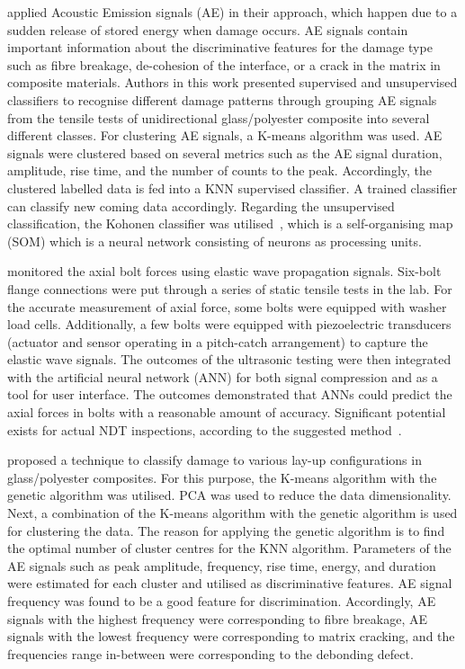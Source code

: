 \textcite{Godin2004} applied Acoustic Emission signals (AE) in their approach, which happen due to a sudden release of stored energy when damage occurs.
AE signals contain important information about the discriminative features 
for the damage type such as fibre breakage, de-cohesion of the interface, or a crack in the matrix in composite materials.
Authors in this work presented supervised and unsupervised classifiers to recognise different damage patterns through grouping AE signals from the tensile tests of unidirectional glass/polyester composite into several different classes. 
For clustering AE signals, a K-means algorithm was used. 
AE signals were clustered based on several metrics such as the AE signal duration, amplitude, rise time, and the number of counts to the peak.
Accordingly, the clustered labelled data is fed into a KNN supervised classifier.
A trained classifier can classify new coming data accordingly.
Regarding the unsupervised classification, the Kohonen classifier was utilised~\cite{58325}, which is a self-organising map (SOM) which is a neural network consisting of neurons as processing units. 


\textcite{Nazarko2020} monitored the axial bolt forces using elastic wave propagation signals.
Six-bolt flange connections were put through a series of static tensile tests in the lab. 
For the accurate measurement of axial force, some bolts were equipped with washer load cells.
Additionally, a few bolts were equipped with piezoelectric transducers (actuator and sensor operating in a pitch-catch arrangement) to capture the elastic wave signals.
The outcomes of the ultrasonic testing were then integrated with the artificial neural network (ANN) for both signal compression and as a tool for user interface. 
The outcomes demonstrated that ANNs could predict the axial forces in bolts with a reasonable amount of accuracy. 
Significant potential exists for actual NDT inspections, according to the suggested method~\cite{Nazarko2020}. 

\textcite{Pashmforoush2014} proposed a technique to classify damage to various lay-up configurations in glass/polyester composites.
For this purpose, the K-means algorithm with the genetic algorithm was utilised. 
PCA was used to reduce the data dimensionali\-ty.
Next, a combination of the K-means algorithm with the genetic algorithm is used for clustering the data. 
The reason for applying the genetic algorithm is to find the optimal number of cluster centres for the KNN algorithm.
Parameters of the AE signals such as peak amplitude, frequency, rise time, energy, and duration were estimated for each cluster and utilised as discriminative features. 
AE signal frequency was found to be a good feature for discrimination. Accordingly, AE signals with the highest frequency were corresponding to fibre breakage, AE signals with the lowest frequency were corresponding to matrix cracking, and the frequencies range in-between were corresponding to the debonding defect. 

